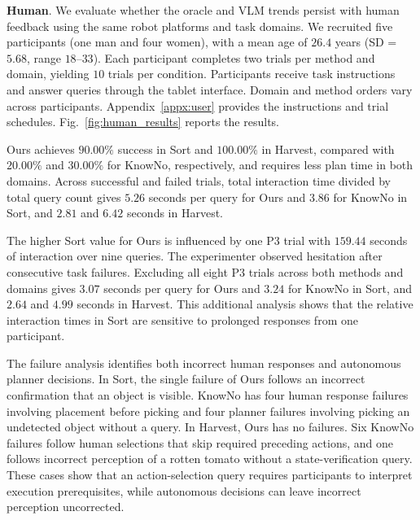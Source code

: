 \vspace{10pt}
\noindent\textbf{Human}\label{exp:human_eval}. 
We evaluate whether the oracle and VLM trends persist with human feedback using the same robot platforms and task domains. We recruited five participants (one man and four women), with a mean age of $26.4$ years (SD = $5.68$, range $18$--$33$). Each participant completes two trials per method and domain, yielding $10$ trials per condition. Participants receive task instructions and answer queries through the tablet interface. Domain and method orders vary across participants. Appendix~\ref{appx:user} provides the instructions and trial schedules. Fig.~\ref{fig:human_results} reports the results.


Ours achieves $90.00\%$ success in Sort and $100.00\%$ in Harvest, compared with $20.00\%$ and $30.00\%$ for KnowNo, respectively, and requires less plan time in both domains. Across successful and failed trials, total interaction time divided by total query count gives $5.26$ seconds per query for Ours and $3.86$ for KnowNo in Sort, and $2.81$ and $6.42$ seconds in Harvest.


The higher Sort value for Ours is influenced by one P3 trial with $159.44$ seconds of interaction over nine queries. The experimenter observed hesitation after consecutive task failures. Excluding all eight P3 trials across both methods and domains gives $3.07$ seconds per query for Ours and $3.24$ for KnowNo in Sort, and $2.64$ and $4.99$ seconds in Harvest. This additional analysis shows that the relative interaction times in Sort are sensitive to prolonged responses from one participant.


The failure analysis identifies both incorrect human responses and autonomous planner decisions. In Sort, the single failure of Ours follows an incorrect confirmation that an object is visible. KnowNo has four human response failures involving placement before picking and four planner failures involving picking an undetected object without a query. In Harvest, Ours has no failures. Six KnowNo failures follow human selections that skip required preceding actions, and one follows incorrect perception of a rotten tomato without a state-verification query. These cases show that an action-selection query requires participants to interpret execution prerequisites, while autonomous decisions can leave incorrect perception uncorrected.


